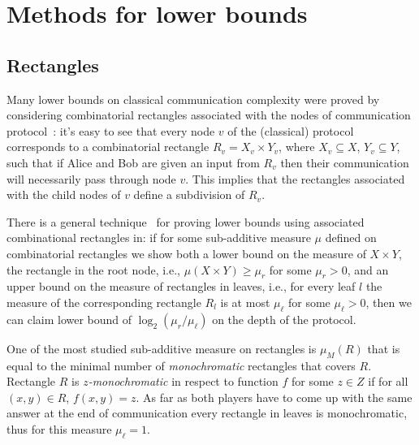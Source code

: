 \section{Methods for lower bounds}\label{sec:methods}
\subsection{Rectangles}\label{subsec:rectangles}
Many lower bounds on classical communication complexity were proved by considering
combinatorial rectangles associated with the nodes of communication protocol~\cite{KN97}: 
it's easy to see that every node $v$ of the (classical)
protocol corresponds to a combinatorial rectangle $R_v = X_v\times Y_v$, 
where $X_v\subseteq X$, $Y_v\subseteq Y$, such that if Alice and Bob are given an input from $R_v$
then their communication will necessarily pass through node $v$. This implies that the rectangles 
associated with the child nodes of $v$ define a subdivision of $R_v$.

There is a general technique~\cite{KN97} for proving lower bounds using associated combinational rectangles in: if for some sub-additive measure  $\mu$ defined on combinatorial rectangles we show both a lower bound on the measure of $X\times Y$, the rectangle in the root node, i.e., $\mu(X\times Y)\ge \mu_r$ for some $\mu_r>0$, and
an upper bound on the measure of rectangles in leaves, i.e., for every leaf $l$ the measure
of the corresponding rectangle $R_l$ is at most $\mu_\ell$ for some $\mu_\ell>0$, 
then we can claim lower bound of $\log_2(\mu_r/\mu_\ell)$ on the depth of the protocol.

One of the most studied sub-additive measure on rectangles is $\mu_M(R)$ that is 
equal to the minimal number of \emph{monochromatic} 
rectangles that covers $R$. Rectangle $R$ is \emph{$z$-monochromatic} in respect to function $f$ 
for some $z\in Z$ if for all $(x,y)\in R$, $f(x,y) = z$.
As far as both players have to come up with the same answer at the end of 
communication every rectangle in leaves is monochromatic, thus for this measure $\mu_\ell = 1$.

